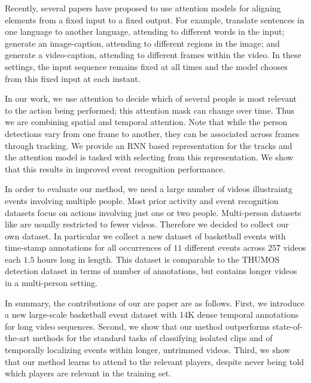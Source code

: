 Recently, several papers have proposed to use attention models for aligning
elements from a fixed input to a fixed output.  For example,
\cite{Bahdnau_arxiv14} translate sentences in one language to another language,
attending to different words in the input; \cite{Xu_arxiv15} generate an image-caption,
attending to different regions in the image; and
\cite{Yao_arxiv15} generate a video-caption, attending to different
frames within the video.  In these settings, the input sequence remains fixed
at all times and the model chooses from this fixed input at each instant.

In our work, we use attention to decide which of several people is most
relevant to the action being performed; this attention mask can change over
time. Thus we are combining spatial and temporal attention.  Note that while
the person detections vary from one frame to another, they can be associated
across frames through tracking. We provide an RNN based representation for the
tracks and the attention model is tasked with selecting from this
representation.  We show that this results in improved event recognition
performance.

In order to evaluate our method, we need a large number of videos illustraintg
events involving multiple people. Most prior activity and event
recognition datasets focus on actions involving just one or two people.
Multi-person datasets like \cite{Ryoo_ICCV09,VIRAT,Choi_ICCV09} are usually restricted to fewer videos.
Therefore we decided to collect our own dataset.
In particular we collect a new dataset of basketball events with time-stamp annotations for
all occurrences of $11$ different events across $257$ videos each $1.5$ hours
long in length.  This dataset is comparable to the THUMOS \cite{THUMOS}
detection dataset in terms of number of annotations, but contains longer videos
in a multi-person setting.

In summary, the contributions of our are paper are as follows.  First, we
introduce a new  large-scale basketball event dataset with 14K dense temporal
annotations for long video sequences.  Second, we show that our method
outperforms state-of-the-art methods for the standard tasks of classifying
isolated clips and of temporally localizing events within longer, untrimmed
videos.  Third, we show that our method learns to attend to the relevant
players, despite never being told which players are relevant in the training
set.
